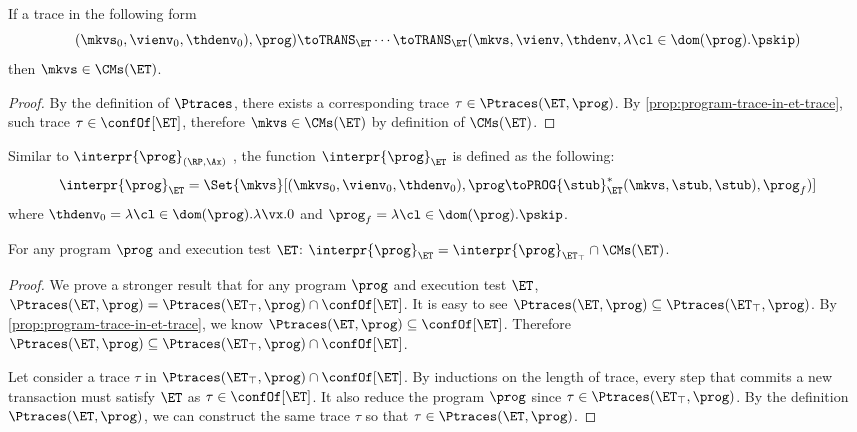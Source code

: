 \begin{corollary}
If a trace in the following form
\[
    (\mkvs_{0}, \vienv_{0}, \thdenv_{0}), \prog) \toTRANS_{\ET} \cdots \toTRANS_{\ET} 
    (\mkvs, \vienv, \thdenv, \lambda \cl \in \dom(\prog). \pskip)
\]
then $\mkvs \in \CMs(\ET)$.
\end{corollary}
\begin{proof}
    By the definition of \( \Ptraces \), 
    there exists a corresponding trace \( \tau \in \Ptraces(\ET, \prog) \).
    By \cref{prop:program-trace-in-et-trace}, such trace \( \tau \in \confOf[\ET] \),
    therefore \( \mkvs \in \CMs(\ET)\) by definition of \( \CMs(\ET) \).
\end{proof}

Similar to \( \interpr{\prog}_{(\RP,\Ax)} \) 
, the function \( \interpr{\prog}_{\ET} \) is defined as the following:
\[
    \interpr{\prog}_{\ET} = \Set{ \mkvs }[ (\mkvs_{0}, \vienv_0, \thdenv_{0} ), \prog \toPROG{\stub}_{\ET}^{\ast} (\mkvs, \stub, \stub ), \prog_{f}) ]
\]
where $\thdenv_{0} = \lambda \cl \in \dom(\prog).\lambda \vx.0$ and $\prog_{f} = \lambda \cl \in \dom(\prog).\pskip$.

\begin{proposition}
    \label{thm:consistency-intersect-permissive}
    For any program $\prog$ and execution test $\ET$:
    \( \interpr{\prog}_{\ET} = \interpr{\prog}_{\ET_\top}  \cap \CMs(\ET) \).
\end{proposition}
\begin{proof}
    We prove a stronger result that for any program $\prog$ and execution test $\ET$, $\Ptraces(\ET, \prog) = \Ptraces(\ET_{\top}, \prog) \cap \confOf[\ET]$.
    It is easy to see \(\Ptraces(\ET, \prog) \subseteq \Ptraces(\ET_\top, \prog) \).
    By \cref{prop:program-trace-in-et-trace}, we know \( \Ptraces(\ET, \prog) \subseteq \confOf[\ET]\).
    Therefore \(  \Ptraces(\ET, \prog) \subseteq \Ptraces(\ET_\top, \prog) \cap \confOf[\ET] \).

    Let consider a trace \( \tau \) in \( \Ptraces(\ET_\top, \prog) \cap \confOf[\ET] \).
    By inductions on the length of trace, 
    every step that commits a new transaction  must satisfy \( \ET \) as \( \tau \in \confOf[\ET] \).
    It also reduce the program \( \prog \) since \( \tau \in \Ptraces(\ET_\top, \prog) \).
    By the definition \( \Ptraces(\ET, \prog) \), we can construct the same trace \( \tau \) so that \( \tau \in \Ptraces(\ET, \prog) \).
\end{proof}
